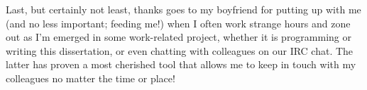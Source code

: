 Last, but certainly not least, thanks goes to my boyfriend for putting up with
me (and no less important; feeding me!) when I often work strange hours and zone
out as I'm emerged in some work-related project, whether it is programming or
writing this dissertation, or even chatting with colleagues on our IRC chat.
The latter has proven a most cherished tool that allows me to keep in touch
with my colleagues no matter the time or place!

